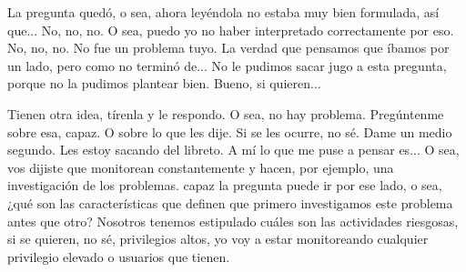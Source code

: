 \begin{description}[leftmargin=0cm, labelsep=0.5cm]
    \item[\textbf{MUNTAABSKI FEDERICO:}] La pregunta quedó, o sea, ahora leyéndola no estaba muy bien formulada, así que... No, no, no. O sea, puedo yo no haber interpretado correctamente por eso. No, no, no. No fue un problema tuyo. La verdad que pensamos que íbamos por un lado, pero como no terminó de... No le pudimos sacar jugo a esta pregunta, porque no la pudimos plantear bien. Bueno, si quieren...

    \item[\textbf{MOCIULSKY SANTIAGO:}] Tienen otra idea, tírenla y le respondo. O sea, no hay problema. Pregúntenme sobre esa, capaz. O sobre lo que les dije. Si se les ocurre, no sé. Dame un medio segundo. Les estoy sacando del libreto. A mí lo que me puse a pensar es... O sea, vos dijiste que monitorean constantemente y hacen, por ejemplo, una investigación de los problemas. capaz la pregunta puede ir por ese lado, o sea, ¿qué son las características que definen que primero investigamos este problema antes que otro? Nosotros tenemos estipulado cuáles son las actividades riesgosas, si se quieren, no sé, privilegios altos, yo voy a estar monitoreando cualquier privilegio elevado o usuarios que tienen.


\end{description}
